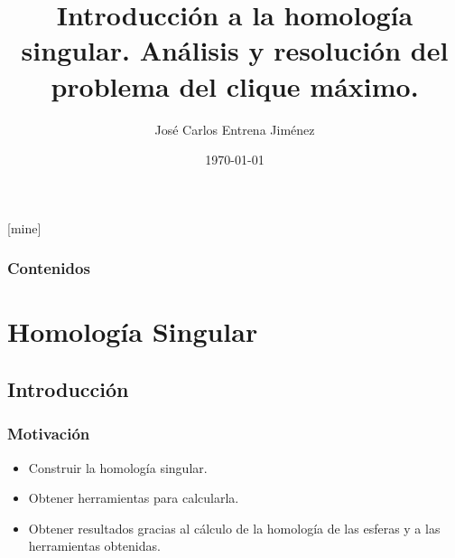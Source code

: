 \documentclass{beamer}
\title[Homología Singular. Problema del clíque máximo.]{Introducción a la homología singular. Análisis y resolución del problema del clique máximo.} %
\author{José Carlos Entrena Jiménez} %
\institute[UGR] %
{
  Universidad de Granada \\ %
  \medskip
  \textit{jentrena@correo.ugr.es} %
}
\date{\today} %
\theoremstyle{theorem}
\begin{document}
\theoremstyle{definition}
[mine]

\frame{\titlepage}

\begin{frame}
  \frametitle{Contenidos} %
  \tableofcontents
\end{frame}



\section{Homología Singular} %

\subsection{Introducción} %


\begin{frame}
  \frametitle{Motivación}
  \begin{itemize}
    \item Construir la homología singular.
    \item Obtener herramientas para calcularla.
    \item Obtener resultados gracias al cálculo de la homología de las esferas  y a las herramientas obtenidas.
  \end{itemize}

\end{frame}
\end{document}
